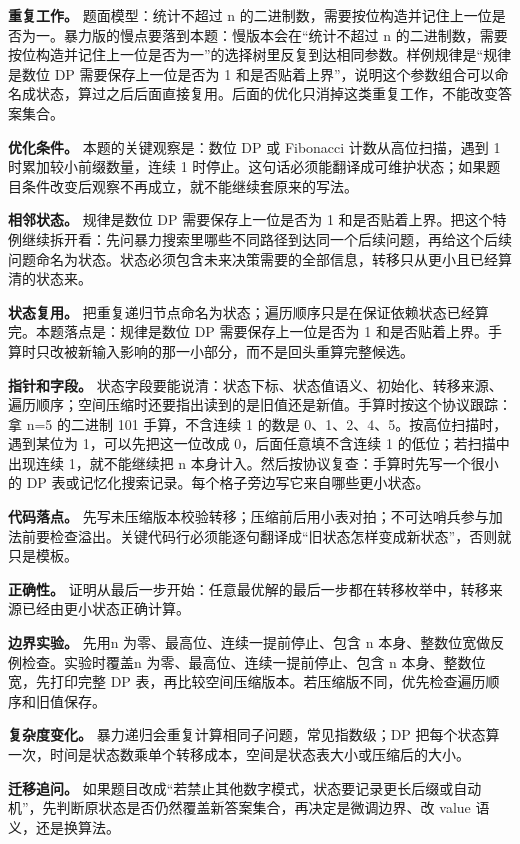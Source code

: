 \textbf{重复工作。} 题面模型：统计不超过 n 的二进制数，需要按位构造并记住上一位是否为一。暴力版的慢点要落到本题：慢版本会在“统计不超过 n 的二进制数，需要按位构造并记住上一位是否为一”的选择树里反复到达相同参数。样例规律是“规律是数位 DP 需要保存上一位是否为 1 和是否贴着上界”，说明这个参数组合可以命名成状态，算过之后后面直接复用。后面的优化只消掉这类重复工作，不能改变答案集合。

\textbf{优化条件。} 本题的关键观察是：数位 DP 或 Fibonacci 计数从高位扫描，遇到 1 时累加较小前缀数量，连续 1 时停止。这句话必须能翻译成可维护状态；如果题目条件改变后观察不再成立，就不能继续套原来的写法。

\textbf{相邻状态。} 规律是数位 DP 需要保存上一位是否为 1 和是否贴着上界。把这个特例继续拆开看：先问暴力搜索里哪些不同路径到达同一个后续问题，再给这个后续问题命名为状态。状态必须包含未来决策需要的全部信息，转移只从更小且已经算清的状态来。

\textbf{状态复用。} 把重复递归节点命名为状态；遍历顺序只是在保证依赖状态已经算完。本题落点是：规律是数位 DP 需要保存上一位是否为 1 和是否贴着上界。手算时只改被新输入影响的那一小部分，而不是回头重算完整候选。

\textbf{指针和字段。} 状态字段要能说清：状态下标、状态值语义、初始化、转移来源、遍历顺序；空间压缩时还要指出读到的是旧值还是新值。手算时按这个协议跟踪：拿 n=5 的二进制 101 手算，不含连续 1 的数是 0、1、2、4、5。按高位扫描时，遇到某位为 1，可以先把这一位改成 0，后面任意填不含连续 1 的低位；若扫描中出现连续 1，就不能继续把 n 本身计入。然后按协议复查：手算时先写一个很小的 DP 表或记忆化搜索记录。每个格子旁边写它来自哪些更小状态。

\textbf{代码落点。} 先写未压缩版本校验转移；压缩前后用小表对拍；不可达哨兵参与加法前要检查溢出。关键代码行必须能逐句翻译成“旧状态怎样变成新状态”，否则就只是模板。

\textbf{正确性。} 证明从最后一步开始：任意最优解的最后一步都在转移枚举中，转移来源已经由更小状态正确计算。

\textbf{边界实验。} 先用n 为零、最高位、连续一提前停止、包含 n 本身、整数位宽做反例检查。实验时覆盖n 为零、最高位、连续一提前停止、包含 n 本身、整数位宽，先打印完整 DP 表，再比较空间压缩版本。若压缩版不同，优先检查遍历顺序和旧值保存。

\textbf{复杂度变化。} 暴力递归会重复计算相同子问题，常见指数级；DP 把每个状态算一次，时间是状态数乘单个转移成本，空间是状态表大小或压缩后的大小。

\textbf{迁移追问。} 如果题目改成“若禁止其他数字模式，状态要记录更长后缀或自动机”，先判断原状态是否仍然覆盖新答案集合，再决定是微调边界、改 value 语义，还是换算法。

